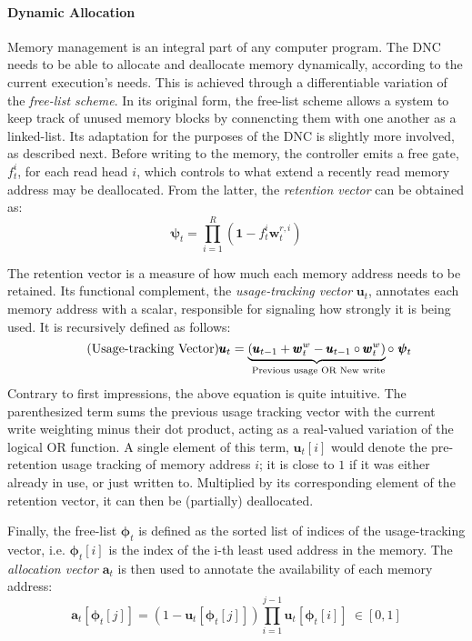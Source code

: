 \documentclass[]{article}
\begin{document}
\paragraph{Dynamic Allocation} Memory management is an integral part of any computer program. The DNC needs to be able to allocate and deallocate memory dynamically, according to the current execution's needs. This is achieved through a differentiable variation of the \textit{free-list scheme}. In its original form, the free-list scheme allows a system to keep track of unused memory blocks by connencting them with one another as a linked-list. Its adaptation for the purposes of the DNC is slightly more involved, as described next. Before writing to the memory, the controller emits a free gate, $f_t^i$, for each read head $i$, which controls to what extend a recently read memory address may be deallocated. From the latter, the \textit{retention vector} can be obtained as:
\[
\tag{Retention Vector}
\pmb{\psi}_t = \prod\limits_{i=1}^{R}{(\pmb{1}-f_t^i \pmb{w}_t^{r,i})}
\]

The retention vector is a measure of how much each memory address needs to be retained. Its functional complement, the \textit{usage-tracking vector} $\pmb{u}_t$, annotates each memory address with a scalar, responsible for signaling how strongly it is being used. It is recursively defined as follows:
\[
\tag{Usage-tracking Vector}
\pmb{u}_t = \underbrace{(\pmb{u}_{t-1} + \pmb{w}_{t}^{w} - \pmb{u}_{t-1} \circ \pmb{w}_t^{w})}_{\text{ \scriptsize Previous usage OR New write}} \circ \ \pmb{\psi}_t
\]
Contrary to first impressions, the above equation is quite intuitive. The parenthesized term sums the previous usage tracking vector with the current write weighting minus their dot product, acting as a real-valued variation of the logical OR function. A single element of this term, $\pmb{u}_t[i]$ would denote the pre-retention usage tracking of memory address $i$; it is close to $1$ if it was either already in use, or just written to. Multiplied by its corresponding element of the retention vector, it can then be (partially) deallocated.
 
Finally, the free-list $\pmb{\phi}_t$ is defined as the sorted list of indices of the usage-tracking vector, i.e. $\pmb{\phi}_t[i]$ is the index of the i-th least used address in the memory. The \textit{allocation vector} $\pmb{a}_t$ is then  used to annotate the availability of each memory address:
\[
\tag{Allocation Vector}
\label{eqn:Allocation Vector}
\pmb{a}_t[\pmb{\phi}_t[j]] = (1 - \pmb{u}_t[\pmb{\phi}_t[j]])\prod\limits_{i=1}^{j-1}{\pmb{u}_t[\pmb{\phi}_t[i]]} \ \in [0,1]
\]
\end{document}
